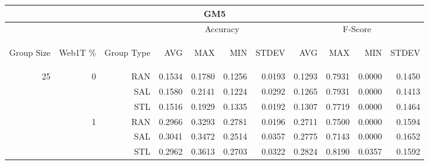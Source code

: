\begin{center}
\begin{table}[htbp]
\begin{tabular}{ | r | r | r | r | r | r | r | r | r | r | r |}
\hline
\multicolumn{11}{|c|}{GM5}\\
\hline
 & & & \multicolumn{4}{|c|}{Accuracy} & \multicolumn{4}{|c|}{F-Score}\\ \cline{4-11}
\begin{sideways}Group Size\end{sideways} & \begin{sideways}Web1T \%\end{sideways} & \begin{sideways}Group Type\end{sideways} & \begin{sideways}AVG\end{sideways} & \begin{sideways}MAX\end{sideways} & \begin{sideways}MIN\end{sideways} & \begin{sideways}STDEV\end{sideways} & \begin{sideways}AVG\end{sideways} & \begin{sideways}MAX\end{sideways} & \begin{sideways}MIN\end{sideways} & \begin{sideways}STDEV\end{sideways}\\
\hline
\multirow{18}{*}{25}
 & \multirow{3}{*}{0} & RAN & 0.1534 & 0.1780 & 0.1256 & 0.0193 & 0.1293 & 0.7931 & 0.0000 & 0.1450\\ \cline{3-11}
 &   & SAL & 0.1580 & 0.2141 & 0.1224 & 0.0292 & 0.1265 & 0.7931 & 0.0000 & 0.1413\\ \cline{3-11}
 &   & STL & 0.1516 & 0.1929 & 0.1335 & 0.0192 & 0.1307 & 0.7719 & 0.0000 & 0.1464\\ \cline{2-11}
 & \multirow{3}{*}{1} & RAN & 0.2966 & 0.3293 & 0.2781 & 0.0196 & 0.2711 & 0.7500 & 0.0000 & 0.1594\\ \cline{3-11}
 &   & SAL & 0.3041 & 0.3472 & 0.2514 & 0.0357 & 0.2775 & 0.7143 & 0.0000 & 0.1652\\ \cline{3-11}
 &   & STL & 0.2962 & 0.3613 & 0.2703 & 0.0322 & 0.2824 & 0.8190 & 0.0357 & 0.1592\\ \cline{2-11}

\end{tabular}
\end{table}
\end{center}
